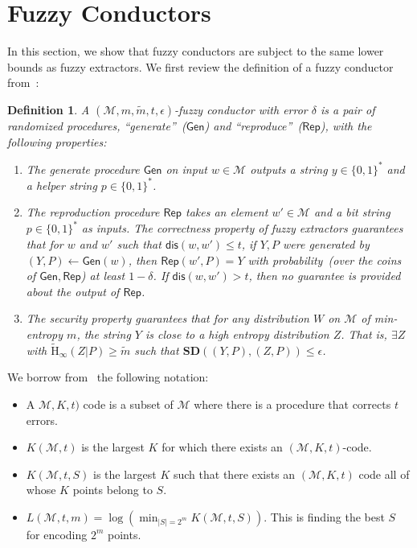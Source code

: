 \documentclass[11pt]{article}
\newcommand{\class}[1]{{\ensuremath{\mathsf{#1}}}}
\newcommand{\gen}{\ensuremath{\class{Gen}}\xspace}
\newcommand{\rep}{\ensuremath{\class{Rep}}\xspace}
\newcommand{\zo}{\ensuremath{\{0, 1\}}}
\newcommand{\dis}{\ensuremath{\mathsf{dis}}}
\newcommand{\Hav}{\tilde{\mathrm{H}}_\infty}
\newtheorem{definition}[theorem]{Definition}
\begin{document}
\section{Fuzzy Conductors}

\label{sec:conductors}
In this section, we show that fuzzy conductors are subject to the same lower bounds as fuzzy extractors.  We first review the definition of a fuzzy conductor from~\cite{KanukurthiR09}:
\begin{definition}
A $(\mathcal{M}, m, \tilde{m}, t, \epsilon)$-\emph{fuzzy conductor} with error $\delta$ is a pair of randomized procedures, ``generate''~(\gen) and ``reproduce''~(\rep), with the following properties:
\begin{enumerate}
\item The generate procedure $\gen$ on input $w\in \mathcal{M}$ outputs a string $y\in\zo^*$ and a helper string $p\in\zo^*$.
\item The reproduction procedure $\rep$ takes an element $w'\in\mathcal{M}$ and a bit string $p\in\zo^*$ as inputs.  The \emph{correctness} property of fuzzy extractors guarantees that for $w$ and $w'$ such that $\dis(w, w')\leq t$, if $Y, P$ were generated by $(Y, P)\leftarrow \gen(w)$, then $\rep(w', P) = Y$ with probability~(over the coins of $\gen, \rep$) at least $1-\delta$.  If $\dis(w, w')>t$, then no guarantee is provided about the output of $\rep$.
\item The security property guarantees that for any distribution $W$ on $\mathcal{M}$ of min-entropy $m$, the string $Y$ is close to a high entropy distribution $Z$.  That is, $\exists Z$ with $\Hav(Z | P ) \geq \tilde{m}$ such that $\mathbf{SD}((Y, P), (Z, P))\leq \epsilon$.
\end{enumerate}
\end{definition}

We borrow from~\cite{DBLP:journals/siamcomp/DodisORS08} the following notation:
\begin{itemize}
\item A $\mathcal{M}, K, t)$ code is a subset of $\mathcal{M}$ where there is a procedure that corrects $t$ errors.
\item $K(\mathcal{M}, t)$ is the largest $K$ for which there exists an $(\mathcal{M}, K, t)$-code.
\item $K(\mathcal{M}, t, S)$ is the largest $K$ such that there exists an $(\mathcal{M}, K, t)$ code all of whose $K$ points belong to $S$.
\item $L(\mathcal{M}, t, m) = \log (\min_{|S| = 2^m} K(\mathcal{M}, t, S))$.  This is finding the best $S$ for encoding $2^m$ points.
\end{itemize}
\end{document}
